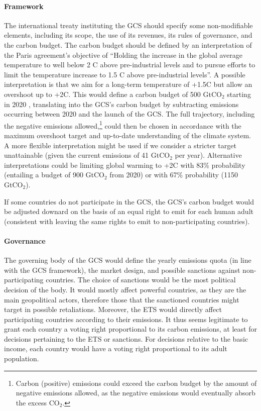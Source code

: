 \documentclass[12pt,english]{article}
\begin{document}
\paragraph{Framework} 
The international treaty instituting the GCS should specify some non-modifiable elements, including its scope, the use of its revenues, its rules of governance, and the carbon budget. The carbon budget should be defined by an interpretation of the Paris agreement's objective of 
``Holding the increase in the global average temperature to well below 2 \textdegree{}C above pre-industrial levels and to pursue efforts to limit the temperature increase to 1.5 \textdegree{}C above pre-industrial levels''. A possible interpretation is that we aim for a long-term temperature of +1.5\textdegree{}C but allow an overshoot up to +2\textdegree{}C. 
This would define a carbon budget of 500 GtCO$_\text{2}$ starting in 2020 \citep{ipcc_climate_2021}, translating into the GCS's carbon budget by subtracting emissions occurring between 2020 and the launch of the GCS. The full trajectory, including the negative emissions allowed,\footnote{Carbon (positive) emissions could exceed the carbon budget by the amount of negative emissions allowed, as the negative emissions would eventually absorb the excess CO$_\text{2}$.} could then be chosen in accordance with the maximum overshoot target and up-to-date understanding of the climate system. A more flexible interpretation might be used if we consider a stricter target unattainable (given the current emissions of 41 GtCO$_\text{2}$ per year). Alternative interpretations could be limiting global warming to +2\textdegree{}C with 83\% probability (entailing a budget of 900 GtCO$_\text{2}$ from 2020) or with 67\% probability (1150 GtCO$_\text{2}$). %

If some countries do not participate in the GCS, the GCS's carbon budget would be adjusted downard on the basis of an equal right to emit for each human adult (consistent with leaving the same rights to emit to non-participating countries).

\paragraph{Governance} 
The governing body of the GCS would define the yearly emissions quota (in line with the GCS framework), the market design, and possible sanctions against non-participating countries. The choice of sanctions would be the most political decision of the body. It would mostly affect powerful countries, as they are the main geopolitical actors, therefore those that the sanctioned countries might target in possible retaliations. Moreover, the ETS would directly affect participating countries according to their emissions. It thus seems legitimate to grant each country a voting right proportional to its carbon emissions, at least for decisions pertaining to the ETS or sanctions. For decisions relative to the basic income, each country would have a voting right proportional to its adult population. 
\end{document}
